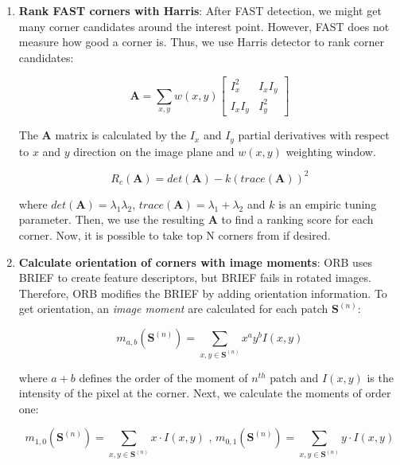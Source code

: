 \documentclass[a4paper]{report}
\numberwithin{figure}{section}
\begin{document}
\begin{enumerate}
	\item \textbf{Rank FAST corners with Harris}: After FAST detection, we 
	might get many corner candidates around the interest point. However, FAST 
	does not measure how good a corner is. Thus, we use Harris detector to 
	rank corner candidates:
	
	\begin{equation}
	\mathbf{A} = \sum_{x,y} w(x,y) 
	\begin{bmatrix}
	I_x^2 & I_xI_y \\ I_xI_y & I_y^2
	\end{bmatrix}
	\end{equation}
	
	The $\mathbf{A}$ matrix is calculated by the $I_x$ and $I_y$ partial 
	derivatives with respect to $x$ and $y$ direction on the image plane and 
	$w(x,y)$ weighting window.
	
	\begin{equation}
	R_c(\mathbf{A}) = det(\mathbf{A}) - k(trace(\mathbf{A}))^2
	\end{equation}
	
	where $det(\mathbf{A}) = \lambda_1 \lambda_2$, $trace(\mathbf{A}) = 
	\lambda_1 + \lambda_2$ and $k$ is an empiric tuning parameter. Then, we 
	use the resulting $\mathbf{A}$ to find a ranking score for each corner. 
	Now, it is possible to take top N corners from if desired.
	
	\item \textbf{Calculate orientation of corners with image moments}: ORB 
	uses BRIEF to create feature descriptors, but BRIEF fails in rotated 
	images. Therefore, ORB modifies the BRIEF by adding orientation 
	information. To get orientation, an \textit{image moment} are calculated 
	for each patch $\mathbf{S}^{(n)}$:
	
	\begin{equation}
	m_{a,b}(\mathbf{S}^{(n)}) = \sum_{x,y \in \mathbf{S}^{(n)}} x^a y^b I(x,y)
	\end{equation}
	
	where $a + b$ defines the order of the moment of $n^{th}$ patch and 
	$I(x,y)$ is the intensity of the pixel at the corner. Next, we calculate 
	the moments of order one: 
	
	\begin{equation}
	m_{1,0}(\mathbf{S}^{(n)}) = \sum_{x,y \in \mathbf{S}^{(n)}} x \cdot I(x,y) 
	\text{  ,  }
	m_{0,1}(\mathbf{S}^{(n)}) = \sum_{x,y \in \mathbf{S}^{(n)}} y \cdot I(x,y)
	\end{equation}
	

\end{enumerate}
\end{document}
